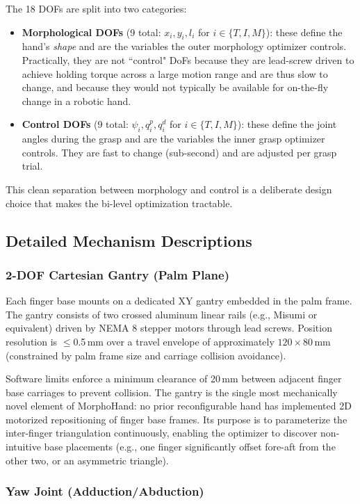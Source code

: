 \documentclass[journal]{IEEEtran}
\begin{document}
The 18 DOFs are split into two categories:
\begin{itemize}
  \item \textbf{Morphological DOFs} (9 total: $x_i, y_i, l_i$ for $i \in \{T,I,M\}$):
    these define the hand's \emph{shape} and are the variables the outer morphology
    optimizer controls. Practically, they are not ``control" DoFs because they are lead-screw driven to achieve holding torque across a large motion range and are thus slow to change, and because they would not typically be available for on-the-fly change in a robotic hand.
  \item \textbf{Control DOFs} (9 total: $\psi_i, q^p_i, q^d_i$ for $i \in \{T,I,M\}$):
    these define the joint angles during the grasp and are the variables the inner grasp
    optimizer controls. They are fast to change (sub-second) and are adjusted per grasp trial.
\end{itemize}
This clean separation between morphology and control is a deliberate design choice that
makes the bi-level optimization tractable.

\subsection{Detailed Mechanism Descriptions}

\subsubsection{2-DOF Cartesian Gantry (Palm Plane)}

Each finger base mounts on a dedicated XY gantry embedded in the palm frame.
The gantry consists of two crossed aluminum linear rails (e.g., Misumi or equivalent)
driven by NEMA 8 stepper motors through lead screws.
Position resolution is $\leq$0.5\,mm over a travel envelope of approximately
$120\times80$\,mm (constrained by palm frame size and carriage collision avoidance).

Software limits enforce a minimum clearance of 20\,mm between adjacent finger base
carriages to prevent collision.
The gantry is the single most mechanically novel element of MorphoHand: no prior
reconfigurable hand has implemented 2D motorized repositioning of finger base frames.
Its purpose is to parameterize the inter-finger triangulation continuously, enabling
the optimizer to discover non-intuitive base placements (e.g., one finger significantly
offset fore-aft from the other two, or an asymmetric triangle).

\subsubsection{Yaw Joint (Adduction/Abduction)}
\end{document}
